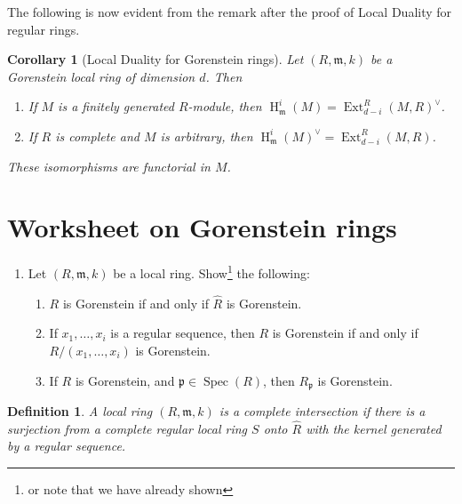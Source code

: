 \documentclass[11pt]{book}
\newtheorem{corollary}[theorem]{Corollary}
\newtheorem{definition}[theorem]{Definition}
\numberwithin{equation}{section}
\numberwithin{theorem}{chapter}
\theoremstyle{definition}
\newtheorem*{basic properties}{Basic Properties}
\newtheorem*{Important Remark}{Important Remark}
\theoremstyle{remark}
\newcommand{\m}{\mathfrak{m}}
\newcommand{\p}{\mathfrak{p}}
\newcommand{\Spec}{\operatorname{Spec}}
\newcommand{\Ext}{\operatorname{Ext}}
\renewcommand{\H}{\operatorname{H}}
\begin{document}
The following is now evident from the remark after the proof of Local Duality for regular rings.

\begin{corollary}[Local Duality for Gorenstein rings] 
	Let $(R,\m,k)$ be a Gorenstein local ring of dimension $d$. Then
\begin{enumerate}[1)]
	\item If $M$ is a finitely generated $R$-module, then $\H^i_\m(M) = \Ext^R_{d-i}(M,R)^{\vee}$.
	\item If $R$ is complete and $M$ is arbitrary, then $\H^i_\m(M)^{\vee} = \Ext^R_{d-i}(M,R)$.
\end{enumerate}
These isomorphisms are functorial in $M$.
\end{corollary}


\section{Worksheet on Gorenstein rings}


\begin{enumerate}
	\item Let $(R,\m,k)$ be a local ring. Show\footnote{or note that we have already shown} the following:
	
	
	\begin{enumerate}
		\item $R$ is Gorenstein if and only if $\widehat{R}$ is Gorenstein.
		
		
		
		\item If $x_1,\dots,x_i$ is a regular sequence, then $R$ is Gorenstein if and only if $R/(x_1,\dots,x_i)$ is Gorenstein.
		
		
		
		\item If $R$ is Gorenstein, and $\p \in \Spec(R)$, then $R_\p$ is Gorenstein.
	\end{enumerate}
\end{enumerate}




\begin{definition} A local ring $(R,\m,k)$ is a \emph{complete intersection} if there is a surjection from a complete regular local ring $S$ onto $\widehat{R}$ with the kernel generated by a regular sequence. 
\end{definition}
\end{document}
